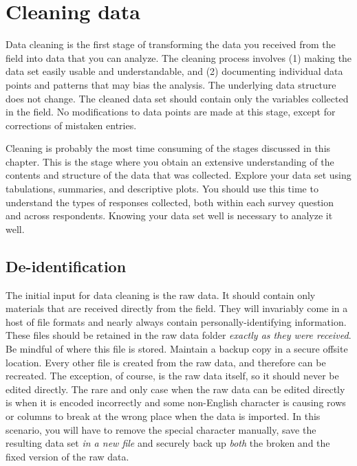 
\section{Cleaning data}

Data cleaning is the first stage of transforming the data you received from the field into data that you can analyze.
The cleaning process involves (1) making the data set easily usable and understandable, 
and (2) documenting individual data points and patterns that may bias the analysis.
The underlying data structure does not change.
The cleaned data set should contain only the variables collected in the field.
No modifications to data points are made at this stage, 
except for corrections of mistaken entries.

Cleaning is probably the most time consuming of the stages discussed in this chapter.
This is the stage where you obtain an extensive understanding of  the contents and structure of the data that was collected.
Explore your data set using tabulations, summaries, and descriptive plots.
You should use this time to understand the types of responses collected, 
both within each survey question and across respondents.
Knowing your data set well is necessary to analyze it well.

\subsection{De-identification}

The initial input for data cleaning is the raw data.
It should contain only materials that are received directly from the field.
They will invariably come in a host of file formats and nearly always contain personally-identifying information.
These files should be retained in the raw data folder \textit{exactly as they were received}.
Be mindful of where this file is stored. 
Maintain a backup copy in a secure offsite location.
Every other file is created from the raw data, and therefore can be recreated.
The exception, of course, is the raw data itself, so it should never be edited 
directly.
The rare and only case when the raw data can be edited directly is when it is encoded incorrectly
and some non-English character is causing rows or columns to break at the wrong place
when the data is imported. 
In this scenario, you will have to remove the special character manually, save the resulting data set \textit{in a new file} and securely back up \textit{both} the broken and the fixed version of the raw data.

